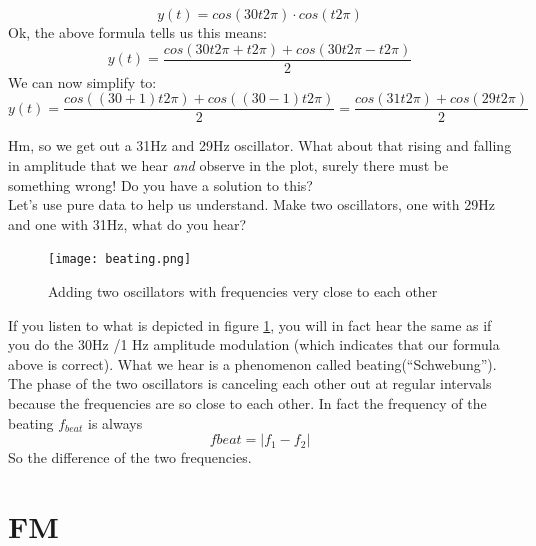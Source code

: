 \begin{equation}
	y(t) = cos(30t2\pi) \cdot cos(t2\pi)
\end{equation}
Ok, the above formula tells us this means:
\begin{equation}
	y(t) = \frac{cos(30t2\pi+t2\pi)+cos(30t2\pi-t2\pi)}{2}
\end{equation}
We can now simplify to:
\begin{equation}
	y(t) = \frac{cos((30+1)t2\pi)+cos((30-1)t2\pi)}{2} = \frac{cos(31t2\pi)+cos(29t2\pi)}{2}
\end{equation}

Hm, so we get out a 31Hz and 29Hz oscillator. What about that rising and falling in amplitude that we hear \textit{and} observe in the plot, surely there must be something wrong! Do you have a solution to this?\\

Let's use pure data to help us understand. Make two oscillators, one with 29Hz and one with 31Hz, what do you hear?

\begin{figure}[h!]
	\centering
	\texttt{[image: beating.png]}
	\caption[adding two oscillators]
	{Adding two oscillators with frequencies very close to each other}
	\label{fig:beating}
\end{figure}

If you listen to what is depicted in figure \ref{fig:beating}, you will in fact hear the same as if you do the 30Hz /1 Hz amplitude modulation (which indicates that our formula above is correct). What we hear is a phenomenon called beating(``Schwebung''). The phase of the two oscillators is canceling each other out at regular intervals because the frequencies are so close to each other. In fact the frequency of the beating $f_{beat}$ is always
\begin{equation}
	f{beat}=|f_1-f_2|
\end{equation}
So the difference of the two frequencies.



\section{FM} %
\label{sub:FM}

